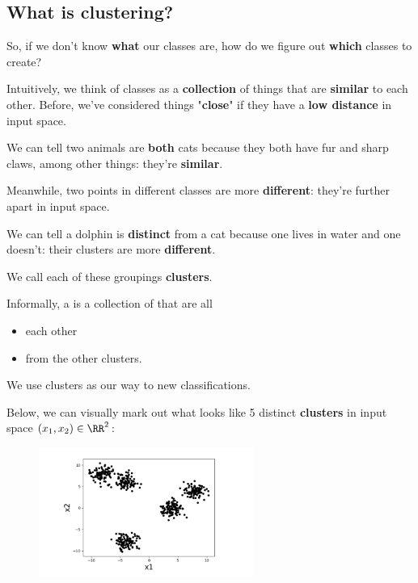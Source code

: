     \subsection*{What is clustering?}
    
        So, if we don't know \textbf{what} our classes are, how do we figure out \textbf{which} classes to create?
        
        Intuitively, we think of classes as a \textbf{collection} of things that are \textbf{similar} to each other. Before, we've considered things "\textbf{close}" if they have a \textbf{low distance} in input space.
            
        \miniex We can tell two animals are \textbf{both} cats because they both have fur and sharp claws, among other things: they're \textbf{similar}.
            
        Meanwhile, two points in different classes are more \textbf{different}: they're further apart in input space. 
        
        \miniex We can tell a dolphin is \textbf{distinct} from a cat because one lives in water and one doesn't: their clusters are more \textbf{different}.
        
        We call each of these groupings \textbf{clusters}.\\
        
        \begin{definition}
            Informally, a  is a collection of  that are all 
            \begin{itemize}
                \item {} each other
                
                \item {} from the other clusters.
            \end{itemize}
            
            We use clusters as our way to  new classifications.
        \end{definition}
        
        \miniex Below, we can visually mark out what looks like 5 distinct \textbf{clusters} in input space $(x_1,x_2) \in \RR^2$:
        
        \begin{figure}[H]
            \centering
            \includegraphics[width=70mm,scale=0.4]{images/clustering_images/clustering_example.png}
        \end{figure}
        
